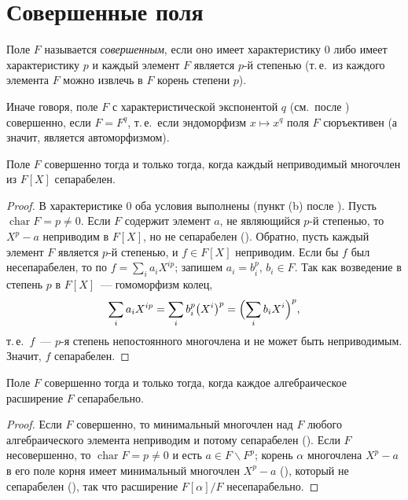 \section{Совершенные поля}

\begin{definition}[2.23]
Поле $F$ называется \emph{совершенным}, если оно имеет характеристику $0$ либо имеет характеристику $p$ и каждый
элемент $F$ является $p$-й степенью (т.\,е.\ из каждого элемента $F$ можно извлечь в $F$ корень степени $p$).
\end{definition}

Иначе говоря, поле $F$ с характеристической экспонентой $q$ (см.\ после ) совершенно, если $F=F^q$, т.\,е.\
если эндоморфизм $x\mapsto x^q$ поля $F$ сюръективен (а значит, является автоморфизмом).

\begin{proposition}[2.24]
Поле $F$ совершенно тогда и только тогда, когда каждый неприводимый многочлен из $F[X]$ сепарабелен.
\end{proposition}

\begin{proof}
В характеристике $0$ оба условия выполнены (пункт (b) после ). Пусть $\operatorname{char}F=p\ne0$. Если $F$
содержит элемент $a$, не являющийся $p$-й степенью, то $X^p-a$ неприводим в $F[X]$, но не сепарабелен (\rf{2.18}).
Обратно, пусть каждый элемент $F$ является $p$-й степенью, и $f\in F[X]$ неприводим. Если бы $f$ был несепарабелен, то
по \rf{2.20} $f=\sum_ia_iX^{ip}$; запишем $a_i=b_i^p$, $b_i\in F$. Так как возведение в степень $p$ в $F[X]$~---
гомоморфизм колец,
\[
\sum_ia_iX^{ip}=\sum_ib_i^p\bigl(X^i\bigr)^p=\Bigl(\sum_ib_iX^i\Bigr)^p,
\]
т.\,е.\ $f$~--- $p$-я степень непостоянного многочлена и не может быть неприводимым. Значит, $f$ сепарабелен.
\end{proof}

\begin{corollary}[2.24a]
Поле $F$ совершенно тогда и только тогда, когда каждое алгебраическое расширение $F$ сепарабельно.
\end{corollary}

\begin{proof}
Если $F$ совершенно, то минимальный многочлен над $F$ любого алгебраического элемента неприводим и потому сепарабелен
(\rf{2.24}). Если $F$ несовершенно, то $\operatorname{char}F=p\ne0$ и есть $a\in F\smallsetminus F^p$; корень $\alpha$
многочлена $X^p-a$ в его поле корня имеет минимальный многочлен $X^p-a$ (\rf{2.3}), который не сепарабелен (\rf{2.18}),
так что расширение $F[\alpha]/F$ несепарабельно.
\end{proof}

